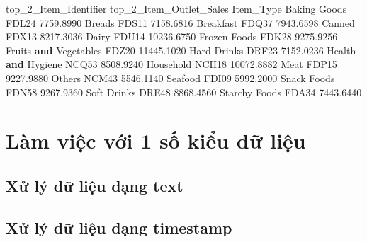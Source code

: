 \documentclass[
]{book}
\newenvironment{Shaded}{\begin{snugshade}}{\end{snugshade}}
\newcommand{\FloatTok}[1]{\textcolor[rgb]{0.00,0.00,0.81}{#1}}
\newcommand{\KeywordTok}[1]{\textcolor[rgb]{0.13,0.29,0.53}{\textbf{#1}}}
\newcommand{\NormalTok}[1]{#1}
\begin{document}
\begin{Shaded}
\begin{Highlighting}[]
\NormalTok{                      top\_2\_Item\_Identifier  top\_2\_Item\_Outlet\_Sales  }
\NormalTok{Item\_Type                                                             }
\NormalTok{Baking Goods                          FDL24                }\FloatTok{7759.8990}  
\NormalTok{Breads                                FDS11                }\FloatTok{7158.6816}  
\NormalTok{Breakfast                             FDQ37                }\FloatTok{7943.6598}  
\NormalTok{Canned                                FDX13                }\FloatTok{8217.3036}  
\NormalTok{Dairy                                 FDU14               }\FloatTok{10236.6750}  
\NormalTok{Frozen Foods                          FDK28                }\FloatTok{9275.9256}  
\NormalTok{Fruits }\KeywordTok{and}\NormalTok{ Vegetables                 FDZ20               }\FloatTok{11445.1020}  
\NormalTok{Hard Drinks                           DRF23                }\FloatTok{7152.0236}  
\NormalTok{Health }\KeywordTok{and}\NormalTok{ Hygiene                    NCQ53                }\FloatTok{8508.9240}  
\NormalTok{Household                             NCH18               }\FloatTok{10072.8882}  
\NormalTok{Meat                                  FDP15                }\FloatTok{9227.9880}  
\NormalTok{Others                                NCM43                }\FloatTok{5546.1140}  
\NormalTok{Seafood                               FDI09                }\FloatTok{5992.2000}  
\NormalTok{Snack Foods                           FDN58                }\FloatTok{9267.9360}  
\NormalTok{Soft Drinks                           DRE48                }\FloatTok{8868.4560}  
\NormalTok{Starchy Foods                         FDA34                }\FloatTok{7443.6440}  
\end{Highlighting}
\end{Shaded}

\chapter{Làm việc với 1 số kiểu dữ liệu}\label{luxe0m-viux1ec7c-vux1edbi-1-sux1ed1-kiux1ec3u-dux1eef-liux1ec7u}

\section{Xử lý dữ liệu dạng text}\label{xux1eed-luxfd-dux1eef-liux1ec7u-dux1ea1ng-text}

\section{Xử lý dữ liệu dạng timestamp}\label{xux1eed-luxfd-dux1eef-liux1ec7u-dux1ea1ng-timestamp}
\end{document}
